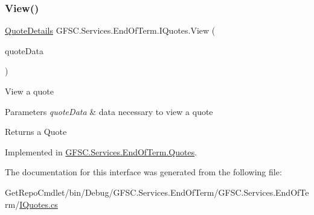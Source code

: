 \subsubsection{\texorpdfstring{View()}{View()}}
{\footnotesize\ttfamily \mbox{\hyperlink{class_g_f_s_c_1_1_services_1_1_end_of_term_1_1_quote_details}{Quote\+Details}} G\+F\+S\+C.\+Services.\+End\+Of\+Term.\+I\+Quotes.\+View (\begin{DoxyParamCaption}\item[{\mbox{\hyperlink{class_g_f_s_c_1_1_services_1_1_end_of_term_1_1_quote_view}{Quote\+View}}}]{quote\+Data }\end{DoxyParamCaption})}



View a quote 


\begin{DoxyParams}{Parameters}
{\em quote\+Data} & data necessary to view a quote\\
\hline
\end{DoxyParams}
\begin{DoxyReturn}{Returns}
a Quote
\end{DoxyReturn}


Implemented in \mbox{\hyperlink{class_g_f_s_c_1_1_services_1_1_end_of_term_1_1_quotes_a68db0939e495f84025bf01b6ef4fbc2a}{G\+F\+S\+C.\+Services.\+End\+Of\+Term.\+Quotes}}.



The documentation for this interface was generated from the following file\+:\begin{DoxyCompactItemize}
\item 
Get\+Repo\+Cmdlet/bin/\+Debug/\+G\+F\+S\+C.\+Services.\+End\+Of\+Term/\+G\+F\+S\+C.\+Services.\+End\+Of\+Term/\mbox{\hyperlink{_i_quotes_8cs}{I\+Quotes.\+cs}}\end{DoxyCompactItemize}
